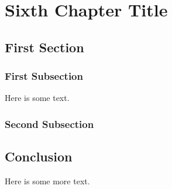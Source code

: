  \chapter{Sixth Chapter Title}


\section{First Section}
\subsection{First Subsection}
Here is some text. 

\subsection{Second Subsection}

\section{Conclusion}
Here is some more text. 
